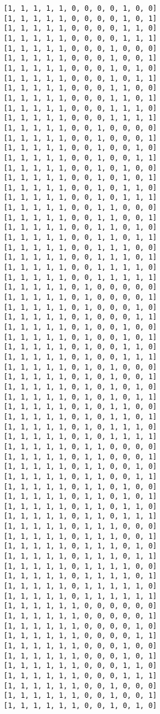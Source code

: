 \documentclass[11pt]{article}
\begin{document}
\begin{Verbatim}[commandchars=\\\{\}]
[1, 1, 1, 1, 1, 0, 0, 0, 0, 1, 0, 0]
[1, 1, 1, 1, 1, 0, 0, 0, 0, 1, 0, 1]
[1, 1, 1, 1, 1, 0, 0, 0, 0, 1, 1, 0]
[1, 1, 1, 1, 1, 0, 0, 0, 0, 1, 1, 1]
[1, 1, 1, 1, 1, 0, 0, 0, 1, 0, 0, 0]
[1, 1, 1, 1, 1, 0, 0, 0, 1, 0, 0, 1]
[1, 1, 1, 1, 1, 0, 0, 0, 1, 0, 1, 0]
[1, 1, 1, 1, 1, 0, 0, 0, 1, 0, 1, 1]
[1, 1, 1, 1, 1, 0, 0, 0, 1, 1, 0, 0]
[1, 1, 1, 1, 1, 0, 0, 0, 1, 1, 0, 1]
[1, 1, 1, 1, 1, 0, 0, 0, 1, 1, 1, 0]
[1, 1, 1, 1, 1, 0, 0, 0, 1, 1, 1, 1]
[1, 1, 1, 1, 1, 0, 0, 1, 0, 0, 0, 0]
[1, 1, 1, 1, 1, 0, 0, 1, 0, 0, 0, 1]
[1, 1, 1, 1, 1, 0, 0, 1, 0, 0, 1, 0]
[1, 1, 1, 1, 1, 0, 0, 1, 0, 0, 1, 1]
[1, 1, 1, 1, 1, 0, 0, 1, 0, 1, 0, 0]
[1, 1, 1, 1, 1, 0, 0, 1, 0, 1, 0, 1]
[1, 1, 1, 1, 1, 0, 0, 1, 0, 1, 1, 0]
[1, 1, 1, 1, 1, 0, 0, 1, 0, 1, 1, 1]
[1, 1, 1, 1, 1, 0, 0, 1, 1, 0, 0, 0]
[1, 1, 1, 1, 1, 0, 0, 1, 1, 0, 0, 1]
[1, 1, 1, 1, 1, 0, 0, 1, 1, 0, 1, 0]
[1, 1, 1, 1, 1, 0, 0, 1, 1, 0, 1, 1]
[1, 1, 1, 1, 1, 0, 0, 1, 1, 1, 0, 0]
[1, 1, 1, 1, 1, 0, 0, 1, 1, 1, 0, 1]
[1, 1, 1, 1, 1, 0, 0, 1, 1, 1, 1, 0]
[1, 1, 1, 1, 1, 0, 0, 1, 1, 1, 1, 1]
[1, 1, 1, 1, 1, 0, 1, 0, 0, 0, 0, 0]
[1, 1, 1, 1, 1, 0, 1, 0, 0, 0, 0, 1]
[1, 1, 1, 1, 1, 0, 1, 0, 0, 0, 1, 0]
[1, 1, 1, 1, 1, 0, 1, 0, 0, 0, 1, 1]
[1, 1, 1, 1, 1, 0, 1, 0, 0, 1, 0, 0]
[1, 1, 1, 1, 1, 0, 1, 0, 0, 1, 0, 1]
[1, 1, 1, 1, 1, 0, 1, 0, 0, 1, 1, 0]
[1, 1, 1, 1, 1, 0, 1, 0, 0, 1, 1, 1]
[1, 1, 1, 1, 1, 0, 1, 0, 1, 0, 0, 0]
[1, 1, 1, 1, 1, 0, 1, 0, 1, 0, 0, 1]
[1, 1, 1, 1, 1, 0, 1, 0, 1, 0, 1, 0]
[1, 1, 1, 1, 1, 0, 1, 0, 1, 0, 1, 1]
[1, 1, 1, 1, 1, 0, 1, 0, 1, 1, 0, 0]
[1, 1, 1, 1, 1, 0, 1, 0, 1, 1, 0, 1]
[1, 1, 1, 1, 1, 0, 1, 0, 1, 1, 1, 0]
[1, 1, 1, 1, 1, 0, 1, 0, 1, 1, 1, 1]
[1, 1, 1, 1, 1, 0, 1, 1, 0, 0, 0, 0]
[1, 1, 1, 1, 1, 0, 1, 1, 0, 0, 0, 1]
[1, 1, 1, 1, 1, 0, 1, 1, 0, 0, 1, 0]
[1, 1, 1, 1, 1, 0, 1, 1, 0, 0, 1, 1]
[1, 1, 1, 1, 1, 0, 1, 1, 0, 1, 0, 0]
[1, 1, 1, 1, 1, 0, 1, 1, 0, 1, 0, 1]
[1, 1, 1, 1, 1, 0, 1, 1, 0, 1, 1, 0]
[1, 1, 1, 1, 1, 0, 1, 1, 0, 1, 1, 1]
[1, 1, 1, 1, 1, 0, 1, 1, 1, 0, 0, 0]
[1, 1, 1, 1, 1, 0, 1, 1, 1, 0, 0, 1]
[1, 1, 1, 1, 1, 0, 1, 1, 1, 0, 1, 0]
[1, 1, 1, 1, 1, 0, 1, 1, 1, 0, 1, 1]
[1, 1, 1, 1, 1, 0, 1, 1, 1, 1, 0, 0]
[1, 1, 1, 1, 1, 0, 1, 1, 1, 1, 0, 1]
[1, 1, 1, 1, 1, 0, 1, 1, 1, 1, 1, 0]
[1, 1, 1, 1, 1, 0, 1, 1, 1, 1, 1, 1]
[1, 1, 1, 1, 1, 1, 0, 0, 0, 0, 0, 0]
[1, 1, 1, 1, 1, 1, 0, 0, 0, 0, 0, 1]
[1, 1, 1, 1, 1, 1, 0, 0, 0, 0, 1, 0]
[1, 1, 1, 1, 1, 1, 0, 0, 0, 0, 1, 1]
[1, 1, 1, 1, 1, 1, 0, 0, 0, 1, 0, 0]
[1, 1, 1, 1, 1, 1, 0, 0, 0, 1, 0, 1]
[1, 1, 1, 1, 1, 1, 0, 0, 0, 1, 1, 0]
[1, 1, 1, 1, 1, 1, 0, 0, 0, 1, 1, 1]
[1, 1, 1, 1, 1, 1, 0, 0, 1, 0, 0, 0]
[1, 1, 1, 1, 1, 1, 0, 0, 1, 0, 0, 1]
[1, 1, 1, 1, 1, 1, 0, 0, 1, 0, 1, 0]

\end{Verbatim}
\end{document}
